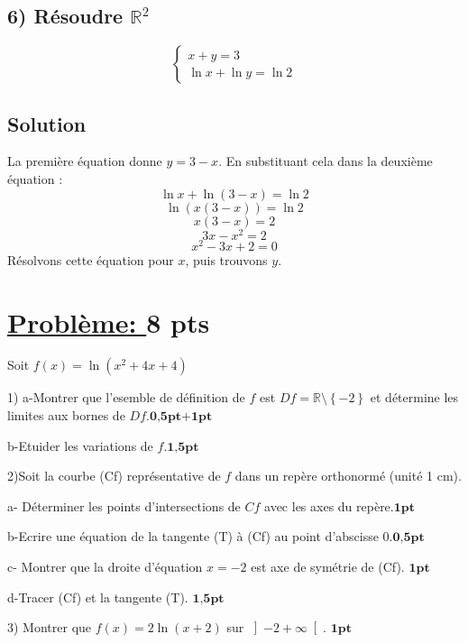 \documentclass[12pt]{article}
\begin{document}
\subsection*{6) Résoudre $\mathbb{R}^{2}$ } 
\[
\begin{cases}
x + y = 3 \\
\ln x + \ln y = \ln 2
\end{cases}
\]

\subsection*{Solution}
La première équation donne \( y = 3 - x \). En substituant cela dans la deuxième équation :
\[
\ln x + \ln (3 - x) = \ln 2
\]
\[
\ln (x(3 - x)) = \ln 2
\]
\[
x(3 - x) = 2
\]
\[
3x - x^2 = 2
\]
\[
x^2 - 3x + 2 = 0
\]
Résolvons cette équation pour \(x\), puis trouvons \(y\).



\section*{\underline{Problème: }\textbf{8 pts}}
Soit $f(x)=\ln(x^{2}+4x+4)$

1) a-Montrer que l'esemble de définition de $f$ est $Df=\mathbb{R}\setminus\left\lbrace -2 \right\rbrace $ et détermine les limites aux bornes de $Df$.$\textbf{0,5pt+1pt}$

b-Etuider les variations de $f$.$\textbf{1,5pt}$

2)Soit la courbe (Cf) représentative de $f$ dans un repère orthonormé (unité 1 cm).

a- Déterminer les points d'intersections de $Cf$ avec les axes du repère.$\textbf{1pt}$

b-Ecrire une équation de la tangente (T) à (Cf) au point d'abscisse 0.$\textbf{0,5pt}$

c- Montrer que la droite d'équation $x=-2$ est axe de  symétrie de (Cf). $\textbf{1pt}$

d-Tracer (Cf) et la tangente (T). $\textbf{1,5pt}$

3) Montrer que $f(x)=2\ln(x+2)$ sur $ \left]-2 +\infty \right[ $. $\textbf{1pt}$
\end{document}
